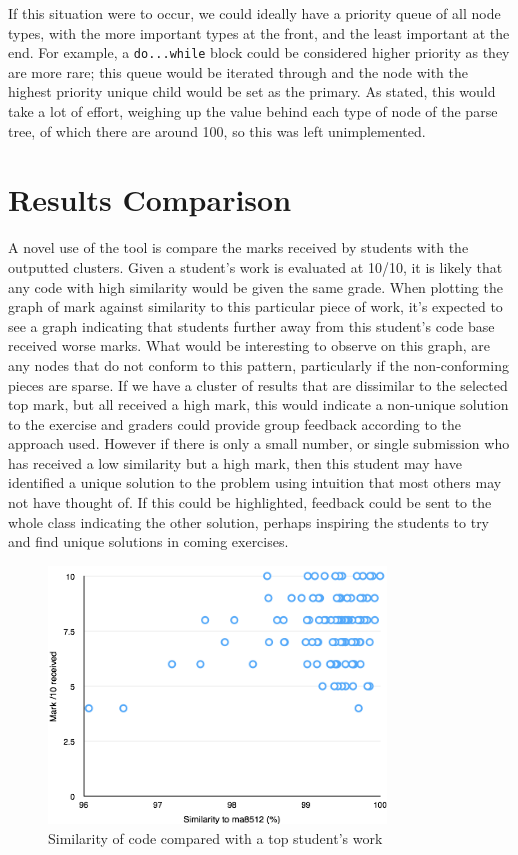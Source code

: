 If this situation were to occur, we could ideally have a priority queue of all
node types, with the more important types at the front, and the least important
at the end. For example, a \texttt{do...while} block could be considered higher
priority as they are more rare; this queue would be iterated through and the 
node with the highest priority unique child would be set as the primary. As stated,
this would take a lot of effort, weighing up the value behind each type of node
of the parse tree, of which there are around 100, so this was left unimplemented.


\section{Results Comparison}

A novel use of the tool is compare the marks received by students with the outputted clusters.
Given a student's work is evaluated at 10/10, it is likely that any
code with high similarity would be given the same grade. When plotting the graph
of mark against similarity to this particular piece of work, it's expected
to see a graph indicating that students further away from this student's code
base received worse marks. What would be interesting to observe on this graph,
are any nodes that do not conform to this pattern, particularly if the non-conforming
pieces are sparse. If we have a cluster of results that are dissimilar to the
selected top mark, but all received a high mark, this would indicate a 
non-unique solution to the exercise and graders could provide group feedback
according to the approach used. However if there is only a small number, or single
submission who has received a low similarity but a high mark, then this student
may have identified a unique solution to the problem using intuition that most
others may not have thought of. If this could be highlighted, feedback could
be sent to the whole class indicating the other solution, perhaps inspiring the
students to try and find unique solutions in coming exercises.

\begin{figure}[h!]

	\centering
		\includegraphics[width=0.8\textwidth]{Figures/SimGraphma8512Loops}
	\caption{Similarity of code compared with a top student's work}
	\label{fig:TopMarkComparison}

\end{figure}

